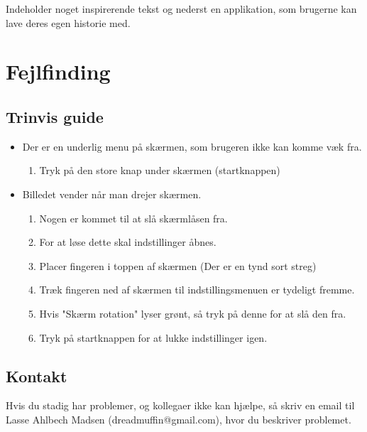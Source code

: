 \documentclass[12pt]{article}
\begin{document}
Indeholder noget inspirerende tekst og nederst en applikation, som brugerne
kan lave deres egen historie med.

\newpage
\section{Fejlfinding}
\subsection{Trinvis guide}
\begin{itemize}
    \item Der er en underlig menu på skærmen, som brugeren ikke kan komme væk
        fra.
        \begin{enumerate}
            \item Tryk på den store knap under skærmen (startknappen)
        \end{enumerate}
    \item Billedet vender når man drejer skærmen.
        \begin{enumerate}
            \item Nogen er kommet til at slå skærmlåsen fra.
            \item For at løse dette skal indstillinger åbnes.
            \item Placer fingeren i toppen af skærmen (Der er en tynd sort
                streg)
            \item Træk fingeren ned af skærmen til indstillingsmenuen er
                tydeligt fremme.
            \item Hvis "Skærm rotation" lyser grønt, så tryk på denne for at
                slå den fra.
            \item Tryk på startknappen for at lukke indstillinger igen.
        \end{enumerate}
\end{itemize}

\subsection{Kontakt}

Hvis du stadig har problemer, og kollegaer ikke kan hjælpe, så skriv en
email til Lasse Ahlbech Madsen (dreadmuffin@gmail.com), hvor du beskriver
problemet.
\end{document}
